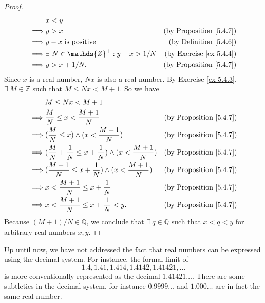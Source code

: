 \begin{proof}
\begin{align*}
& x < y \\
\implies & y > x & \text{(by Proposition \ref{5.4.7})} \\
\implies & y - x \text{ is positive} & \text{(by Definition \ref{5.4.6})} \\
\implies & \exists\ N \in \mathds{Z}^+ : y - x > 1 / N & \text{(by Exercise \ref{ex 5.4.4})} \\
\implies & y > x + 1 / N. & \text{(by Proposition \ref{5.4.7})} \\
\end{align*}
Since \(x\) is a real number, \(Nx\) is also a real number.
By Exercise \ref{ex 5.4.3}, \(\exists\ M \in \mathds{Z}\) such that \(M \leq Nx < M + 1\).
So we have
\begin{align*}
& M \leq Nx < M + 1 \\
\implies & \frac{M}{N} \leq x < \frac{M + 1}{N} & \text{(by Proposition \ref{5.4.7})} \\
\implies & (\frac{M}{N} \leq x) \land (x < \frac{M + 1}{N}) & \text{(by Proposition \ref{5.4.7})} \\
\implies & (\frac{M}{N} + \frac{1}{N} \leq x + \frac{1}{N}) \land (x < \frac{M + 1}{N}) & \text{(by Proposition \ref{5.4.7})} \\
\implies & (\frac{M + 1}{N} \leq x + \frac{1}{N}) \land (x < \frac{M + 1}{N}) & \text{(by Proposition \ref{5.4.7})} \\
\implies & x < \frac{M + 1}{N} \leq x + \frac{1}{N} & \text{(by Proposition \ref{5.4.7})} \\
\implies & x < \frac{M + 1}{N} \leq x + \frac{1}{N} < y. & \text{(by Proposition \ref{5.4.7})}
\end{align*}
Because \((M + 1) / N \in \mathds{Q}\), we conclude that \(\exists\ q \in \mathds{Q}\) such that \(x < q < y\) for arbitrary real numbers \(x, y\).
\end{proof}

\begin{remark}\label{5.4.15}
Up until now, we have not addressed the fact that real numbers can be expressed using the decimal system.
For instance, the formal limit of
\[
    1.4, 1.41, 1.414, 1.4142, 1.41421, \dots
\]
is more conventionally represented as the decimal \(1.41421\dots\).
There are some subtleties in the decimal system, for instance \(0.9999\dots\) and \(1.000\dots\) are in fact the same real number.
\end{remark}

